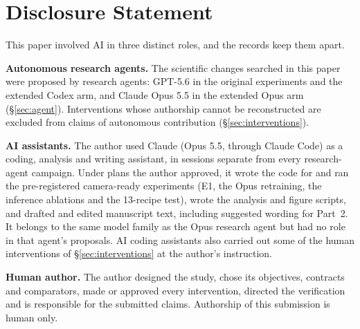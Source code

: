 \documentclass{article}
\newif\ifshowhumanmarkers \showhumanmarkersfalse
\newcommand{\humantag}[1]{{\color{humanframe}\sffamily\scriptsize\bfseries HUMAN AUTHOR MUST REWRITE/VERIFY [#1]}\ }
\newcommand{\humanauthor}[2][]{\ifshowhumanmarkers\begin{humanbox}\humantag{#1}#2\end{humanbox}\else #2\par\fi}
\begin{document}
\section{Disclosure Statement}
\humanauthor[Disclosure r6]{This paper involved AI in three distinct roles, and the records keep them apart.

\textbf{Autonomous research agents.} The scientific changes searched in this paper were proposed by research agents: GPT-5.6 in the original experiments and the extended Codex arm, and Claude Opus 5.5 in the extended Opus arm (\S\ref{sec:agent}). Interventions whose authorship cannot be reconstructed are excluded from claims of autonomous contribution (\S\ref{sec:interventions}).

\textbf{AI assistants.} The author used Claude (Opus 5.5, through Claude Code) as a coding, analysis and writing assistant, in sessions separate from every research-agent campaign. Under plans the author approved, it wrote the code for and ran the pre-registered camera-ready experiments (E1, the Opus retraining, the inference ablations and the 13-recipe test), wrote the analysis and figure scripts, and drafted and edited manuscript text, including suggested wording for Part~2. It belongs to the same model family as the Opus research agent but had no role in that agent's proposals. AI coding assistants also carried out some of the human interventions of \S\ref{sec:interventions} at the author's instruction.

\textbf{Human author.} The author designed the study, chose its objectives, contracts and comparators, made or approved every intervention, directed the verification and is responsible for the submitted claims. Authorship of this submission is human only.}

\clearpage


\end{document}
